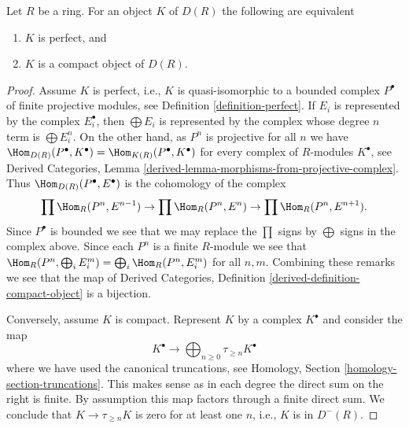 \begin{proposition}
\label{proposition-perfect-is-compact}
Let $R$ be a ring. For an object $K$ of $D(R)$ the following are equivalent
\begin{enumerate}
\item $K$ is perfect, and
\item $K$ is a compact object of $D(R)$.
\end{enumerate}
\end{proposition}

\begin{proof}
Assume $K$ is perfect, i.e., $K$ is quasi-isomorphic to a bounded complex
$P^\bullet$ of finite projective modules, see
Definition \ref{definition-perfect}. If $E_i$ is represented by the complex
$E_i^\bullet$, then $\bigoplus E_i$ is represented by the complex
whose degree $n$ term is $\bigoplus E_i^n$. On the other hand,
as $P^n$ is projective for all $n$ we have
$\Hom_{D(R)}(P^\bullet, K^\bullet) = \Hom_{K(R)}(P^\bullet, K^\bullet)$
for every complex of $R$-modules $K^\bullet$, see
Derived Categories,
Lemma \ref{derived-lemma-morphisms-from-projective-complex}.
Thus $\Hom_{D(R)}(P^\bullet, E^\bullet)$ is the cohomology of the complex
$$
\prod \Hom_R(P^n, E^{n - 1}) \to
\prod \Hom_R(P^n, E^n) \to
\prod \Hom_R(P^n, E^{n + 1}).
$$
Since $P^\bullet$ is bounded we see that we may replace the $\prod$
signs by $\bigoplus$ signs in the complex above. Since each $P^n$ is a finite
$R$-module we see that
$\Hom_R(P^n, \bigoplus_i E_i^m) = \bigoplus_i \Hom_R(P^n, E_i^m)$
for all $n, m$.
Combining these remarks we see that the map of
Derived Categories, Definition \ref{derived-definition-compact-object}
is a bijection.

\medskip\noindent
Conversely, assume $K$ is compact.
Represent $K$ by a complex $K^\bullet$ and consider the map
$$
K^\bullet
\longrightarrow
\bigoplus\nolimits_{n \geq 0} \tau_{\geq n} K^\bullet
$$
where we have used the canonical truncations, see
Homology, Section \ref{homology-section-truncations}.
This makes sense as in each degree the direct sum on the right is finite.
By assumption this map factors through a finite direct sum.
We conclude that $K \to \tau_{\geq n} K$ is zero for at least one $n$,
i.e., $K$ is in $D^{-}(R)$.


\end{proof}
